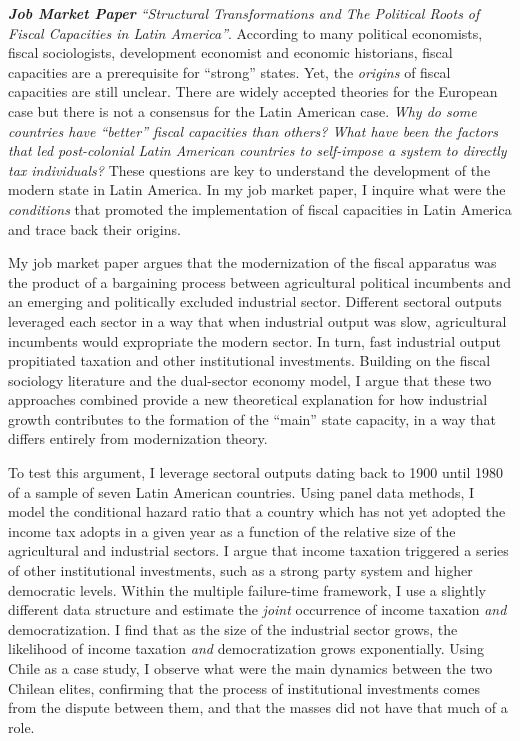 \documentclass[11pt]{letter} %
\begin{document}
\begin{letter}{}
\emph{{\bf Job Market Paper} ``Structural Transformations and The Political Roots of Fiscal Capacities in Latin America''}. According  to many political economists, fiscal sociologists, development economist and economic historians, fiscal capacities are a prerequisite for ``strong'' states. Yet, the \emph{origins} of fiscal capacities are still unclear. There are widely accepted theories for the European case but there is not a consensus for the Latin American case. \emph{Why do some countries have ``better'' fiscal capacities than others? What have been the factors that led post-colonial Latin American countries to self-impose a system to directly tax individuals?} These questions are key to understand the development of the modern state in Latin America. In my job market paper, I inquire what were the \emph{conditions} that promoted the implementation of fiscal capacities in Latin America and trace back their origins.


My job market paper argues that the modernization of the fiscal apparatus was the product of a bargaining process between agricultural political incumbents and an emerging and politically excluded industrial sector. Different sectoral outputs leveraged each sector in a way that when industrial output was slow, agricultural incumbents would expropriate the modern sector. In turn, fast industrial output propitiated taxation and other institutional investments. Building on the fiscal sociology literature and the dual-sector economy model, I argue that these two approaches combined provide a new theoretical explanation for how industrial growth contributes to the formation of the ``main'' state capacity, in a way that differs entirely from modernization theory. 

To test this argument, I leverage sectoral outputs dating back to 1900 until 1980 of a sample of seven Latin American countries. Using panel data methods, I model the conditional hazard ratio that a country which has not yet adopted the income tax adopts in a given year as a function of the relative size of the agricultural and industrial sectors. I argue that income taxation triggered a series of other institutional investments, such as a strong party system and higher democratic levels. Within the multiple failure-time framework, I use a slightly different data structure and estimate the \emph{joint} occurrence of income taxation \emph{and} democratization. I find that as the size of the industrial sector grows, the likelihood of income taxation \emph{and} democratization grows exponentially. Using Chile as a case study, I observe what were the main dynamics between the two Chilean elites, confirming that the process of institutional investments comes from the dispute between them, and that the masses did not have that much of a role. 


\end{letter}
\end{document}
